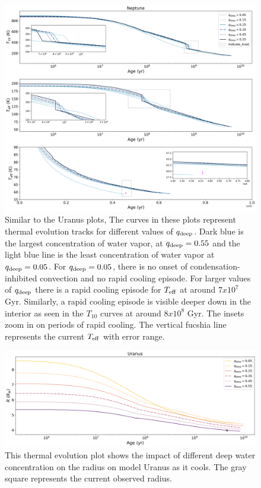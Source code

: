 \documentclass[11pt]{ucscthesisbs}
\begin{document}
\begin{figure}[ht]
 \centerline{
  \includegraphics[scale=0.45]{figures/n_cooling_curves_nz_4096_more_qdeeps.png}
 }
\caption[Thermal Evolution Curves for Neptune - Water Vapor Concentration Comparisons]
{Similar to the Uranus plots, The curves in these plots represent thermal evolution tracks for different values of $q_{\rm deep}$. Dark blue is the largest concentration of water vapor, at $q_{\rm deep} = 0.55$ and the light blue line is the least concentration of water vapor at $q_{\rm deep} = 0.05$. For $q_{\rm deep} = 0.05$, there is no onset of condensation-inhibited convection and no rapid cooling episode. For larger values of $q_{\rm deep}$ there is a rapid cooling episode for $T_{\rm eff}$ at around $7 x 10^7$ Gyr. Similarly, a rapid cooling episode is visible deeper down in the interior as seen in the $T_{10}$ curves at around $8 x 10^8$ Gyr.  The insets zoom in on periods of rapid cooling. The vertical fucshia line represents the current $T_{\rm eff}$ with error range.}
\label{fig:evolve_neptune_qdeeps}
\end{figure}



\begin{figure}[ht]
 \centerline{
  \includegraphics[scale=0.45]{figures/u_cooling_radius_nz_4096_logx_more_qdeeps.png}
 }
\caption[Thermal Evolution Curves for Uranus - Radius]
{This thermal evolution plot shows the impact of different deep water concentration on the radius on model Uranus as it cools. The gray square represents the current observed radius.}
\label{fig:evolve_uranus_radius}
\end{figure}
\end{document}
